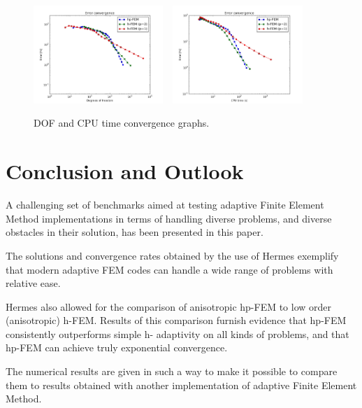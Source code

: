 \documentclass[12pt]{elsarticle}
\begin{document}
\begin{figure}[H]
\centering
\vspace{-5mm}
\includegraphics[height=3.7cm]{nist/nist-12/conv_dof_aniso.png}\ \
\includegraphics[height=3.7cm]{nist/nist-12/conv_cpu_aniso.png}
\vspace{-5mm}
\caption{DOF and CPU time convergence graphs.}
\vspace{-5mm}
\label{fig:nist-12-conv}
\end{figure}


\section{Conclusion and Outlook}
\label{sec:conclusion}

A challenging set of benchmarks aimed at testing adaptive Finite Element Method implementations in terms of handling diverse problems, and diverse obstacles in their solution, has been presented in this paper.

The solutions and convergence rates obtained by the use of Hermes exemplify that modern adaptive FEM codes can handle a wide range of problems with relative ease.

Hermes also allowed for the comparison of anisotropic hp-FEM to low order (anisotropic) h-FEM. Results of this comparison furnish evidence that hp-FEM consistently outperforms simple h- adaptivity on all kinds of problems, and that hp-FEM can achieve truly exponential convergence.

The numerical results are given in such a way to make it possible to compare them to results obtained with another implementation of adaptive Finite Element Method.
\end{document}
